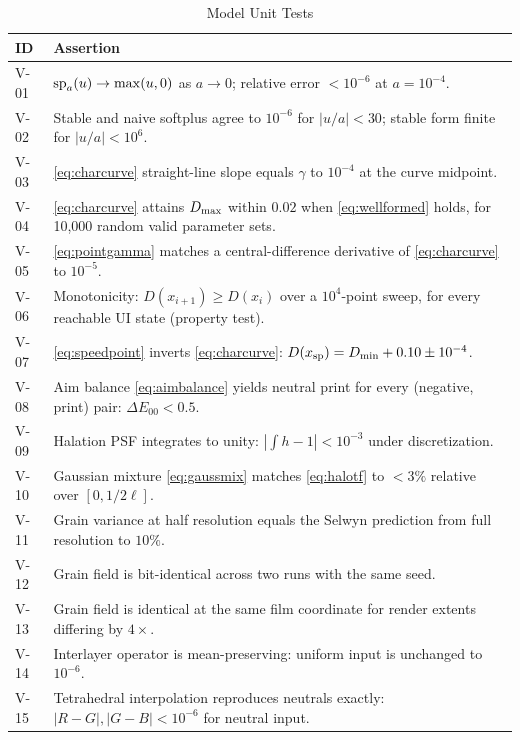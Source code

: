 \begin{table}[htbp]
\caption{Model Unit Tests}
\label{tab:unittests}
\begin{center}
\renewcommand{\arraystretch}{1.12}
\begin{tabularx}{\columnwidth}{@{}l>{\raggedright\arraybackslash}X@{}}
\toprule
\textbf{ID} & \textbf{Assertion} \\
\midrule
V-01 & $\mathrm{sp}_{a}\!\left(u\right) \to \max(u,0)$ as $a \to 0$; relative error $< 10^{-6}$ at $a = 10^{-4}$. \\
V-02 & Stable and naive softplus agree to $10^{-6}$ for $|u/a| < 30$; stable form finite for $|u/a| < 10^{6}$. \\
V-03 & \eqref{eq:charcurve} straight-line slope equals $\gamma$ to $10^{-4}$ at the curve midpoint. \\
V-04 & \eqref{eq:charcurve} attains $D_{\max}$ within $0.02$ when \eqref{eq:wellformed} holds, for 10{,}000 random valid parameter sets. \\
V-05 & \eqref{eq:pointgamma} matches a central-difference derivative of \eqref{eq:charcurve} to $10^{-5}$. \\
V-06 & Monotonicity: $D(x_{i+1}) \geq D(x_i)$ over a $10^4$-point sweep, for every reachable UI state (property test). \\
V-07 & \eqref{eq:speedpoint} inverts \eqref{eq:charcurve}: $D(x_{\mathrm{sp}}) = D_{\min} + 0.10 \pm 10^{-4}$. \\
V-08 & Aim balance \eqref{eq:aimbalance} yields neutral print for every (negative, print) pair: $\Delta E_{00} < 0.5$. \\
V-09 & Halation PSF integrates to unity: $\left|\int h - 1\right| < 10^{-3}$ under discretization. \\
V-10 & Gaussian mixture \eqref{eq:gaussmix} matches \eqref{eq:halotf} to $< 3\%$ relative over $[0, 1/2\ell]$. \\
V-11 & Grain variance at half resolution equals the Selwyn prediction from full resolution to $10\%$. \\
V-12 & Grain field is bit-identical across two runs with the same seed. \\
V-13 & Grain field is identical at the same film coordinate for render extents differing by $4\times$. \\
V-14 & Interlayer operator is mean-preserving: uniform input is unchanged to $10^{-6}$. \\
V-15 & Tetrahedral interpolation reproduces neutrals exactly: $|R - G|, |G - B| < 10^{-6}$ for neutral input. \\

\end{tabularx}
\end{center}
\end{table}
